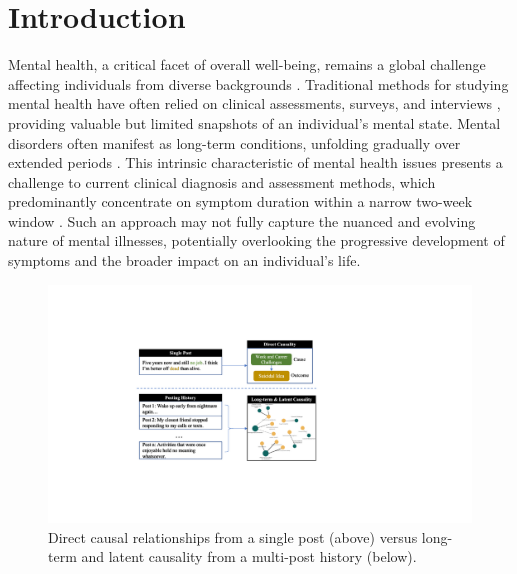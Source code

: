 \section{Introduction}
\label{sec:intro}



Mental health, a critical facet of overall well-being, remains a global challenge affecting individuals from diverse backgrounds \cite{Dreisbach2019systematic}. 
Traditional methods for studying mental health have often relied on clinical assessments, surveys, and interviews \cite{beck1996beck}, providing valuable but limited snapshots of an individual's mental state. Mental disorders often manifest as long-term conditions, unfolding gradually over extended periods \cite{collingridge2010long}. This intrinsic characteristic of mental health issues presents a challenge to current clinical diagnosis and assessment methods, which predominantly concentrate on symptom duration within a narrow two-week window \cite{american2013diagnostic}. Such an approach may not fully capture the nuanced and evolving nature of mental illnesses, potentially overlooking the progressive development of symptoms and the broader impact on an individual's life. 
\begin{figure}[th]
	\centering
	\includegraphics[width=\linewidth]{figures/overview.pdf}
	\caption{Direct causal relationships from a single post (above) versus long-term and latent causality from a multi-post history (below).}
	\label{fig:overview}
\end{figure}

